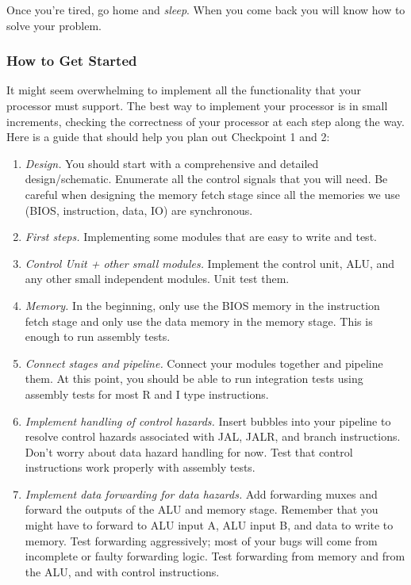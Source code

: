 \documentclass[11pt]{article}
\begin{document}
Once you're tired, go home and \textit{sleep}. When you come back you will know how to solve your problem.

\subsubsection{How to Get Started}
It might seem overwhelming to implement all the functionality that your processor must support. The best way to implement your processor is in small increments, checking the correctness of your processor at each step along the way. Here is a guide that should help you plan out Checkpoint 1 and 2:

\begin{enumerate}
  \item \textit{Design.} You should start with a comprehensive and detailed design/schematic. Enumerate all the control signals that you will need. Be careful when designing the memory fetch stage since all the memories we use (BIOS, instruction, data, IO) are synchronous.
  \item \textit{First steps.} Implementing some modules that are easy to write and test.
  \item \textit{Control Unit + other small modules.} Implement the control unit, ALU, and any other small independent modules. Unit test them.
  \item \textit{Memory.} In the beginning, only use the BIOS memory in the instruction fetch stage and only use the data memory in the memory stage. This is enough to run assembly tests.
  \item \textit{Connect stages and pipeline.} Connect your modules together and pipeline them. At this point, you should be able to run integration tests using assembly tests for most R and I type instructions.
  \item \textit{Implement handling of control hazards.} Insert bubbles into your pipeline to resolve control hazards associated with JAL, JALR, and branch instructions. Don't worry about data hazard handling for now. Test that control instructions work properly with assembly tests.
  \item \textit{Implement data forwarding for data hazards.} Add forwarding muxes and forward the outputs of the ALU and memory stage. Remember that you might have to forward to ALU input A, ALU input B, and data to write to memory. Test forwarding aggressively; most of your bugs will come from incomplete or faulty forwarding logic. Test forwarding from memory and from the ALU, and with control instructions.

\end{enumerate}
\end{document}
